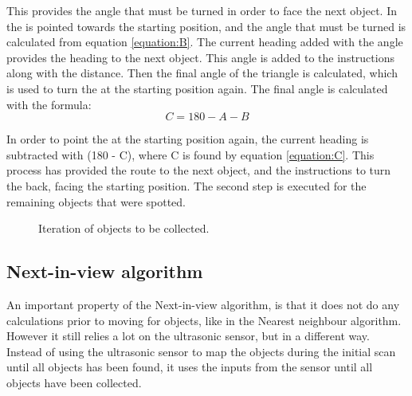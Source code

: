 This provides the angle that must be turned in order to face the next object. In  the \projname{} is pointed towards the starting position, and the angle that must be turned is calculated from equation \ref{equation:B}. The current heading added with the angle provides the heading to the next object. This angle is added to the instructions along with the distance. Then the final angle of the triangle is calculated, which is used to turn the \projname{} at the starting position again. The final angle is calculated with the formula:
\begin{equation}
C = 180 - A - B \label{equation:C}
\end{equation}

In order to point the \projname{} at the starting position again, the current heading is subtracted with (180 - C), where C is found by equation \ref{equation:C}. This process has provided the route to the next object, and the instructions to turn the \projname{} back, facing the starting position. The second step is executed for the remaining objects that were spotted. 

\begin{figure}[H]
     \caption{\label{fig:object_navigation_iteration} Iteration of objects to be collected.}
\end{figure}


\subsection{Next-in-view algorithm} \label{sec:niv-algorithm}
An important property of the Next-in-view algorithm, is that it does not do any calculations prior to moving for objects, like in the Nearest neighbour algorithm. However it still relies a lot on the ultrasonic sensor, but in a different way. Instead of using the ultrasonic sensor to map the objects during the initial scan until all objects has been found, it uses the inputs from the sensor until all objects have been collected.

